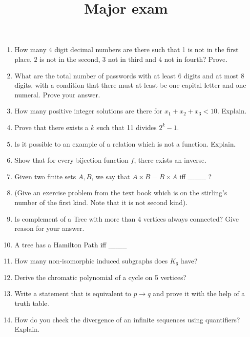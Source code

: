 \documentclass{article}
\begin{document}
\title{Major exam}
\maketitle
\begin{enumerate}
 \item How many 4 digit decimal numbers are there such that 1 is not in the first place, 2 is not in the second, 3 not in third and 4 not in fourth? Prove.
 \item What are the total number of passwords with at least 6 digits and at most 8 digits, with a condition that there must at least be one capital letter and one numeral. Prove your answer.

 \item How many positive integer solutions are there for $x_1+x_2+x_3<10$. Explain.

	

 \item Prove that there exists a $k$ such that 11 divides $2^k -1 $.  



 \item Is it possible to an example of a relation which is not a function. Explain.
 \item Show that for every bijection function $f$, there exists an inverse.
 \item Given two finite sets $A,B$, we say that $A \times B = B \times A$ iff $\_\_\_\_\_\_\_\_$ ?
 
 \item (Give an exercise problem from the text book which is on the stirling's number of the first kind. Note that it is not second kind).

 \item Is complement of a Tree with more than 4 vertices always connected? Give reason for your answer.
 \item A tree has a Hamilton Path iff $\_\_\_\_\_\_\_\_ $ 
 \item How many non-isomorphic induced subgraphs does $K_6$ have?
 \item Derive the chromatic polynomial of a cycle on 5 vertices? 

 \item Write a statement that is equivalent to $p\rightarrow q$ and prove it with the help of a truth table.
 \item How do you check the divergence of an infinite sequences using quantifiers? Explain.


\end{enumerate}
\end{document}
